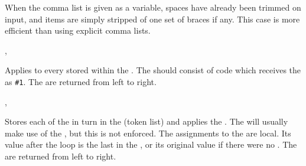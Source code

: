 \documentclass[oneside]{book}
\begin{document}
When the comma list is given as a variable, spaces
have already been trimmed on input, and items are simply stripped
of one set of braces if any. This case is more efficient than using
explicit comma lists.


\begin{function}{\ClistMapInline,\ClistVarMapInline}
\begin{syntax}
  
  
\end{syntax}
Applies  to every  stored
within the . The  should
consist of code which receives the  as \verb|#1|.
The  are returned from left to right.
\begin{demohigh}
\IgnoreSpacesOn
\TlClear \lTmpaTl
{} {
  \TlPutRight {}
}
\TlUse \lTmpaTl
\IgnoreSpacesOff
\end{demohigh}
\end{function}

\begin{function}{\ClistMapVariable,\ClistVarMapVariable}
\begin{syntax}
   
   
\end{syntax}
Stores each  of the  in turn in the
(token list)  and applies the .  The
 will usually make use of the , but this
is not enforced.  The assignments to the  are local.
Its value after the loop is the last  in the , or its original value if there were no .  The
 are returned from left to right.
\begin{demohigh}
\IgnoreSpacesOn
{} \lTmpiTl {
  \TlPutRight \gTmpaTl {\Expand {(\lTmpiTl)}}
}
\TlUse \gTmpaTl
\IgnoreSpacesOff
\end{demohigh}
\end{function}
\end{document}
